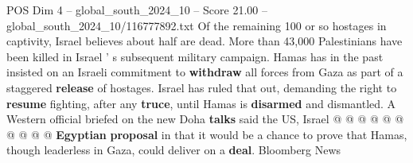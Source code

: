 \begin{textsample}{POS Dim 4 – global\_south\_2024\_10 – Score 21.00 – global\_south\_2024\_10/116777892.txt}
Of the remaining 100 or so hostages in captivity, Israel believes about half are dead.
More than 43,000 Palestinians have been killed in Israel ' s subsequent military campaign.
Hamas has in the past insisted on an Israeli commitment to \textbf{withdraw} all forces from Gaza as part of a staggered \textbf{release} of hostages.
Israel has ruled that out, demanding the right to \textbf{resume} fighting, after any \textbf{truce}, until Hamas is \textbf{disarmed} and dismantled.
A Western official briefed on the new Doha \textbf{talks} said the US, Israel @ @ @ @ @ @ @ @ @ @ \textbf{Egyptian} \textbf{proposal} in that it would be a chance to prove that Hamas, though leaderless in Gaza, could deliver on a \textbf{deal}.
Bloomberg News

\end{textsample}
